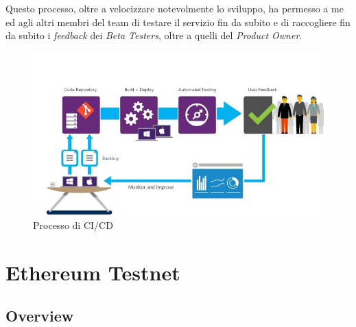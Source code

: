 \documentclass[11pt]{thesistemp}
\begin{document}
Questo processo, oltre a velocizzare notevolmente lo sviluppo, ha permesso a me ed agli altri membri del team di testare il servizio fin da subito e di raccogliere fin da subito i \textit{feedback} dei \textit{Beta Testers}, oltre a quelli del \textit{Product Owner}.
\begin{figure}[h]
    \centering
    \includegraphics[scale=0.59]{ci-cd.png}
        \caption{Processo di CI/CD}
    \label{fig:ci-cd}
\end{figure}

\section{Ethereum Testnet}

\subsection{Overview}
\end{document}
